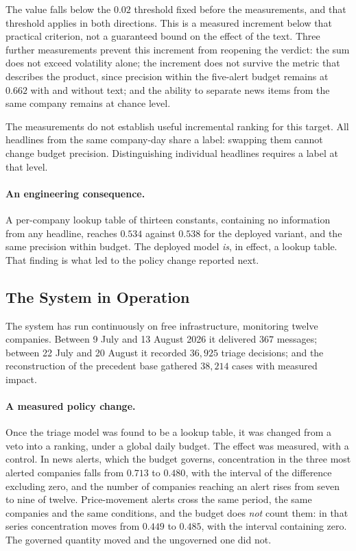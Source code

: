 \documentclass[runningheads]{llncs}
\begin{document}
The value falls below the $0.02$ threshold fixed before the measurements, and that
threshold applies in both directions. This is a measured increment below that practical
criterion, not a guaranteed bound on the effect of the text. Three further measurements prevent
this increment from reopening the verdict: the sum does not exceed volatility alone; the
increment does not survive the metric that describes the product, since precision within the
five-alert budget remains at $0.662$ with and without text; and the ability to separate news
items from the same company remains at chance level.

The measurements do not establish useful incremental ranking for this target. All headlines
from the same company-day share a label: swapping them cannot change budget precision.
Distinguishing individual headlines requires a label at that level.

\paragraph{An engineering consequence.} A per-company lookup table of thirteen constants,
containing no information from any headline, reaches $0.534$ against $0.538$ for the
deployed variant, and the same precision within budget. The deployed model \emph{is}, in
effect, a lookup table. That finding is what led to the policy change reported next.

\subsection{The System in Operation}

The system has run continuously on free infrastructure, monitoring twelve companies.
Between 9 July and 13 August 2026 it delivered $367$ messages; between 22 July and 20
August it recorded $36{,}925$ triage decisions; and the reconstruction of the precedent
base gathered $38{,}214$ cases with measured impact.

\paragraph{A measured policy change.} Once the triage model was found to be a lookup table,
it was changed from a veto into a ranking, under a global daily budget. The effect was
measured, with a control. In news alerts, which the budget governs, concentration in the
three most alerted companies falls from $0.713$ to $0.480$, with the interval of the
difference excluding zero, and the number of companies reaching an alert rises from seven to
nine of twelve. Price-movement alerts cross the same period, the same companies and the same
conditions, and the budget does \emph{not} count them: in that series concentration moves
from $0.449$ to $0.485$, with the interval containing zero. The governed quantity moved and
the ungoverned one did not.
\end{document}
